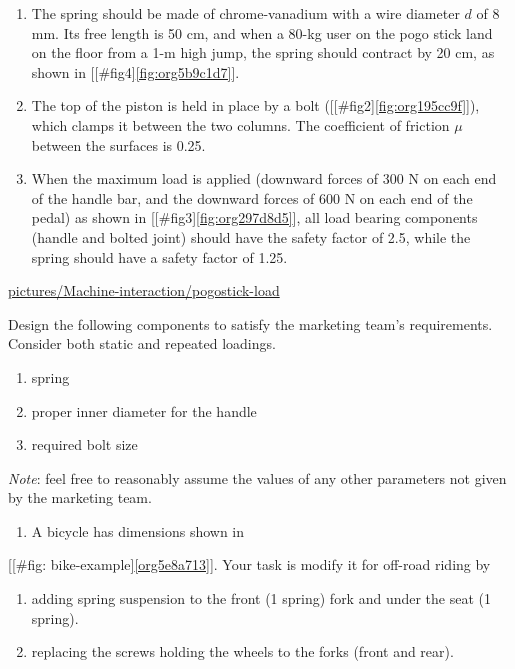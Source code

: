 \documentclass[a4paper,openany,12pt]{book}
\begin{document}
{{\begin{enumerate}
\item The spring should be made of chrome-vanadium with a wire diameter \(d\)
of 8 mm. Its free length is 50 cm, and when a 80-kg user on the pogo
stick land on the floor from a 1-m high jump, the spring should
contract by 20 cm, as shown in [[\#fig4]\ref{fig:org5b9c1d7}].

\item The top of the piston is held in place by a bolt ([[\#fig2]\ref{fig:org195cc9f}]),
which clamps it between the two columns. The coefficient of friction
\(\mu\) between the surfaces is 0.25.

\item When the maximum load is applied (downward forces of 300 N on each
end of the handle bar, and the downward forces of 600 N on each end
of the pedal) as shown in [[\#fig3]\ref{fig:org297d8d5}], all load bearing
components (handle and bolted joint) should have the safety factor of
2.5, while the spring should have a safety factor of 1.25.
\end{enumerate}


\url{pictures/Machine-interaction/pogostick-load}

Design the following components to satisfy the marketing team's
requirements. Consider both static and repeated loadings.

\begin{enumerate}
\item spring

\item proper inner diameter for the handle

\item required bolt size
\end{enumerate}

\emph{Note}: feel free to reasonably assume the values of any other
parameters not given by the marketing team.

\begin{enumerate}
\item A bicycle has dimensions shown in
\end{enumerate}
[[\#fig: bike-example]\ref{org5e8a713}]. Your task is modify it for
off-road riding by

\begin{enumerate}
\item adding spring suspension to the front (1 spring) fork and under the
seat (1 spring).

\item replacing the screws holding the wheels to the forks (front and
rear).


\end{enumerate}}}
\end{document}

